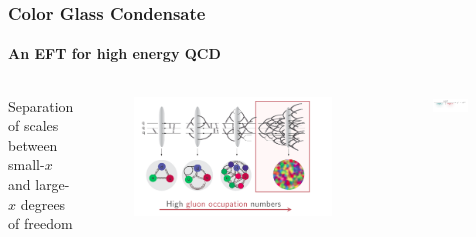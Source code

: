 \documentclass[aspectratio=169,11pt,usenames,dvipsnames]{beamer}
\begin{document}
\begin{frame}[noframenumbering]
    \frametitle{Color Glass Condensate}
    \framesubtitle{An EFT for high energy QCD}
    \vspace{-10pt}
    \begin{columns}[onlytextwidth,t]
            \begin{center}
                {\footnotesize Separation of scales between\\
                {\color{customgreen}small-{\tiny $x$}} and {\color{custompink}large-{\huge $x$}} degrees of freedom}
            \end{center}
            \vspace{-10pt}
            \begin{figure}[!hbt]
                \centering
                \includegraphics[width=\textwidth]{images/qcd_2.png}
                \captionsetup{justification=centering}
            \end{figure}
        \begin{center}
            \begin{figure}[!hbt]
                \centering
                \includegraphics[width=0.9\textwidth]{images/small_large_x.png}
                \captionsetup{justification=centering}

\end{figure}
\end{center}
\end{columns}
\end{frame}
\end{document}
